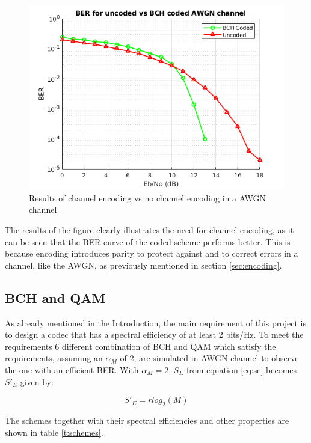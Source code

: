 \documentclass[11pt]{report}
\begin{document}
\begin{figure}[h!]
	\centering
	\includegraphics[scale=0.65]{resources/uncoded.png}
	\caption{Results of channel encoding vs no channel encoding in a AWGN channel}
    \label{fig:unc}
\end{figure}
\vspace{12pt}
The results of the figure clearly illustrates the need for channel encoding, as it can be seen that the BER curve of the coded scheme performs better. This is because encoding introduces parity to protect against and to correct errors in a channel, like the AWGN, as previously mentioned in section \ref{sec:encoding}.
\\
\subsection{BCH and QAM}
\label{sub:bchqam}
As already mentioned in the Introduction, the main requirement of this project is to design a codec that has a spectral efficiency of at least 2 bits/Hz. To meet the requirements 6 different combination of BCH and QAM which satisfy the requirements, assuming an $\alpha_M$ of 2, are simulated in AWGN channel to observe the one with an efficient BER. With $\alpha_M = 2$, $S_E$ from equation \ref{eq:se} becomes $S'_E$ given by:

\begin{equation}
\label{newse}
S'_E = rlog_2(M)
\end{equation}

The schemes together with their spectral efficiencies and other properties are shown in table \ref{t:schemes}.
\end{document}
